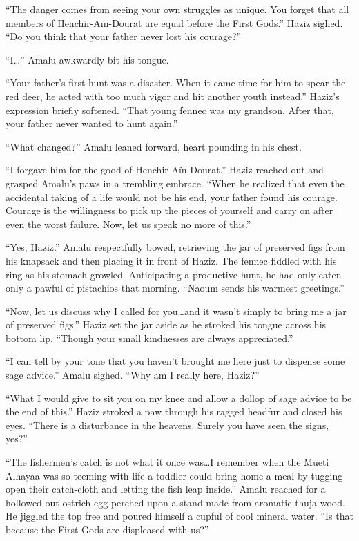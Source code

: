``The danger comes from seeing your own struggles as unique. You forget that all members of Henchir-Aïn-Dourat are equal before the First Gods.'' Haziz sighed. ``Do you think that your father never lost his courage?''

``I\ldots'' Amalu awkwardly bit his tongue.

``Your father's first hunt was a disaster. When it came time for him to spear the red deer, he acted with too much vigor and hit another youth instead.'' Haziz's expression briefly softened. ``That young fennec was my grandson. After that, your father never wanted to hunt again.''

``What changed?'' Amalu leaned forward, heart pounding in his chest.

``I forgave him for the good of Henchir-Aïn-Dourat.'' Haziz reached out and grasped Amalu's paws in a trembling embrace. ``When he realized that even the accidental taking of a life would not be his end, your father found his courage. Courage is the willingness to pick up the pieces of yourself and carry on after even the worst failure. Now, let us speak no more of this.''

``Yes, Haziz.'' Amalu respectfully bowed, retrieving the jar of preserved figs from his knapsack and then placing it in front of Haziz. The fennec fiddled with his ring as his stomach growled. Anticipating a productive hunt, he had only eaten only a pawful of pistachios that morning. ``Naoum sends his warmest greetings.''

``Now, let us discuss why I called for you\ldots and it wasn't simply to bring me a jar of preserved figs.'' Haziz set the jar aside as he stroked his tongue across his bottom lip. ``Though your small kindnesses are always appreciated.''

``I can tell by your tone that you haven't brought me here just to dispense some sage advice.'' Amalu sighed. ``Why am I really here, Haziz?''

``What I would give to sit you on my knee and allow a dollop of sage advice to be the end of this.'' Haziz stroked a paw through his ragged headfur and closed his eyes. ``There is a disturbance in the heavens. Surely you have seen the signs, yes?''

``The fishermen's catch is not what it once was\ldots I remember when the Mueti Alhayaa was so teeming with life a toddler could bring home a meal by tugging open their catch-cloth and letting the fish leap inside.'' Amalu reached for a hollowed-out ostrich egg perched upon a stand made from aromatic thuja wood. He jiggled the top free and poured himself a cupful of cool mineral water. ``Is that because the First Gods are displeased with us?''

